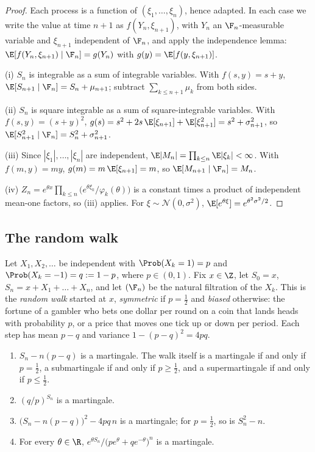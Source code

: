 \begin{proof}
Each process is a function of $(\xi_1,\dots,\xi_n)$, hence adapted. In each case we write the
value at time $n+1$ as $f(Y_n,\xi_{n+1})$, with $Y_n$ an $\F_n$-measurable variable and
$\xi_{n+1}$ independent of $\F_n$, and apply the independence lemma:
$\E[f(Y_n,\xi_{n+1})\mid\F_n]=g(Y_n)$ with $g(y)=\E[f(y,\xi_{n+1})]$.

(i) $S_n$ is integrable as a sum of integrable variables. With $f(s,y)=s+y$,
$\E[S_{n+1}\mid\F_n]=S_n+\mu_{n+1}$; subtract $\sum_{k\le n+1}\mu_k$ from both sides.

(ii) $S_n$ is square integrable as a sum of square-integrable variables. With
$f(s,y)=(s+y)^2$, $g(s)=s^2+2s\,\E[\xi_{n+1}]+\E[\xi_{n+1}^2]=s^2+\sigma_{n+1}^2$, so
$\E[S_{n+1}^2\mid\F_n]=S_n^2+\sigma_{n+1}^2$.

(iii) Since $|\xi_1|,\dots,|\xi_n|$ are independent, $\E|M_n|=\prod_{k\le n}\E|\xi_k|<\infty$.
With $f(m,y)=my$, $g(m)=m\,\E[\xi_{n+1}]=m$, so $\E[M_{n+1}\mid\F_n]=M_n$.

(iv) $Z_n=e^{\theta x}\prod_{k\le n}\big(e^{\theta\xi_k}/\varphi_k(\theta)\big)$ is a constant
times a product of independent mean-one factors, so (iii) applies. For
$\xi\sim\mathcal N(0,\sigma^2)$, $\E[e^{\theta\xi}]=e^{\theta^2\sigma^2/2}$.
\end{proof}

\subsection*{The random walk}

Let $X_1,X_2,\dots$ be independent with $\Prob(X_k=1)=p$ and $\Prob(X_k=-1)=q:=1-p$, where
$p\in(0,1)$. Fix $x\in\Z$, let $S_0=x$, $S_n=x+X_1+\dots+X_n$, and let $(\F_n)$ be the natural
filtration of the $X_k$. This is the \emph{random walk} started at $x$, \emph{symmetric} if
$p=\frac12$ and \emph{biased} otherwise: the fortune of a gambler who bets one dollar per
round on a coin that lands heads with probability $p$, or a price that moves one tick up or
down per period. Each step has mean $p-q$ and variance $1-(p-q)^2=4pq$.

\begin{corollary}\label{cor:mg-walk}
\leavevmode
\begin{enumerate}[label=(\alph*)]
  \item $S_n-n(p-q)$ is a martingale. The walk itself is a martingale if and only if
    $p=\frac12$, a submartingale if and only if $p\ge\frac12$, and a supermartingale if and
    only if $p\le\frac12$.
  \item $(q/p)^{S_n}$ is a martingale.
  \item $\big(S_n-n(p-q)\big)^2-4pq\,n$ is a martingale; for $p=\frac12$, so is $S_n^2-n$.
  \item For every $\theta\in\R$, $e^{\theta S_n}/\big(pe^{\theta}+qe^{-\theta}\big)^n$ is a
    martingale.
\end{enumerate}
\end{corollary}

